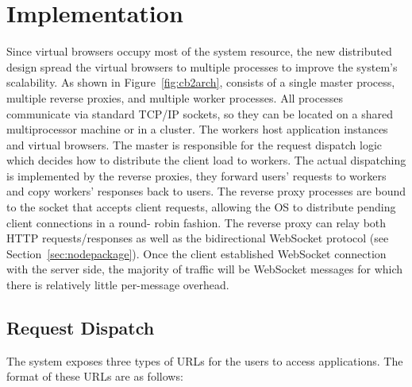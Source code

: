 \chapter{Implementation}
\label{ch:impl}

\newarchitectureoverview{}

Since virtual browsers occupy most of the system resource, the new
distributed design spread the virtual browsers to multiple processes
to improve the system's scalability.
As shown in Figure~\ref{fig:cb2arch}, \cbtwo consists of a
single master process, multiple reverse proxies, and multiple worker
processes. All processes communicate via standard TCP/IP sockets, so they can
be located on a shared multiprocessor machine or in a cluster. The workers
host application instances and virtual browsers. The master is responsible for
the request dispatch logic which decides how to distribute the client load to
workers. The actual dispatching is implemented by the reverse proxies, they
forward users' requests to workers and copy workers' responses back to users.
The reverse proxy processes are bound to the socket that accepts client
requests, allowing the OS to distribute pending client connections in a round-
robin fashion.
The reverse proxy can relay both HTTP requests/responses as
well as the bidirectional WebSocket protocol (see Section~\ref{sec:nodepackage}).
Once the client established WebSocket connection with
the server side, the majority of traffic will be WebSocket
messages for which there is relatively little per-message overhead.




\section{Request Dispatch}
\label{sec:reqdis}

The system exposes three types of URLs for the users to access \cb applications.
The format of these URLs are as follows:

